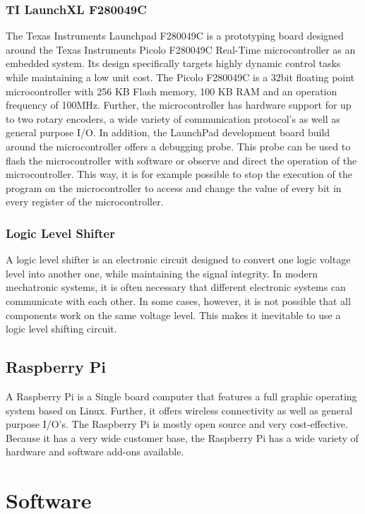 \subsubsection{TI LaunchXL F280049C}
The Texas Instruments Launchpad F280049C is a prototyping board designed around the Texas Instruments Picolo F280049C Real-Time microcontroller as an embedded system. Its design specifically targets highly dynamic control tasks while maintaining a low unit cost.
The Picolo F280049C is a 32bit floating point microcontroller with 256 KB Flash memory, 100 KB RAM and an operation frequency of 100MHz.
Further, the microcontroller has hardware support for up to two rotary encoders, a wide variety of communication protocol's as well as general purpose I/O.
In addition, the LaunchPad development board build around the microcontroller offers a debugging probe. This probe can be used to flash the microcontroller with software or observe and direct the operation of the microcontroller.
This way, it is for example possible to stop the execution of the program on the microcontroller to access and change the value of every bit in every register of the microcontroller.\cite{TILAUNCHXL}
 
\subsubsection{Logic Level Shifter}
A logic level shifter is an electronic circuit designed to convert one logic voltage level into another one, while maintaining the signal integrity. In modern mechatronic systems, it is often necessary that different electronic systems can communicate with each other. In some cases, however, it is not possible that all components work on the same voltage level. This makes it inevitable to use a logic level shifting circuit.\cite{berle2018tabellenbuch}
 
 
\subsection{Raspberry Pi}
A Raspberry Pi is a Single board computer that features a full graphic operating system based on Linux. Further, it offers wireless connectivity as well as general purpose I/O's. The Raspberry Pi is mostly open source and very cost-effective. Because it has a very wide customer base, the Raspberry Pi has a wide variety of hardware and software add-ons available.\cite{RaspberryPiFoundation}
 
\section{Software}
